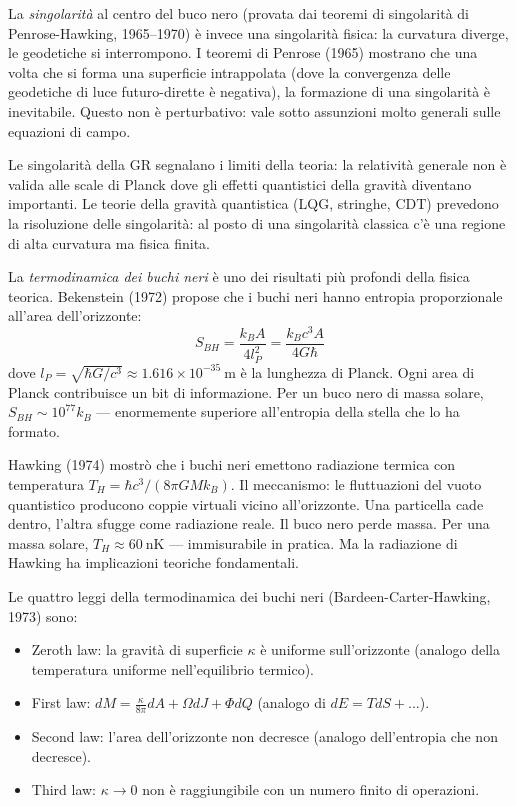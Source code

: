 \documentclass[11.5pt,a4paper,openany]{book}
\theoremstyle{remark}
\begin{document}
La \textit{singolarità} al centro del buco nero (provata dai teoremi di singolarità di Penrose-Hawking, 1965--1970) è invece una singolarità fisica: la curvatura diverge, le geodetiche si interrompono. I teoremi di Penrose (1965) mostrano che una volta che si forma una superficie intrappolata (dove la convergenza delle geodetiche di luce futuro-dirette è negativa), la formazione di una singolarità è inevitabile. Questo non è perturbativo: vale sotto assunzioni molto generali sulle equazioni di campo.

Le singolarità della GR segnalano i limiti della teoria: la relatività generale non è valida alle scale di Planck dove gli effetti quantistici della gravità diventano importanti. Le teorie della gravità quantistica (LQG, stringhe, CDT) prevedono la risoluzione delle singolarità: al posto di una singolarità classica c'è una regione di alta curvatura ma fisica finita.

La \textit{termodinamica dei buchi neri} è uno dei risultati più profondi della fisica teorica. Bekenstein (1972) propose che i buchi neri hanno entropia proporzionale all'area dell'orizzonte:
\[
S_{BH} = \frac{k_B A}{4 l_P^2} = \frac{k_B c^3 A}{4G\hbar}
\]
dove $l_P = \sqrt{\hbar G/c^3} \approx 1.616 \times 10^{-35}\ \text{m}$ è la lunghezza di Planck. Ogni area di Planck contribuisce un bit di informazione. Per un buco nero di massa solare, $S_{BH} \sim 10^{77} k_B$ --- enormemente superiore all'entropia della stella che lo ha formato.

Hawking (1974) mostrò che i buchi neri emettono radiazione termica con temperatura $T_H = \hbar c^3/(8\pi GM k_B)$. Il meccanismo: le fluttuazioni del vuoto quantistico producono coppie virtuali vicino all'orizzonte. Una particella cade dentro, l'altra sfugge come radiazione reale. Il buco nero perde massa. Per una massa solare, $T_H \approx 60\ \text{nK}$ --- immisurabile in pratica. Ma la radiazione di Hawking ha implicazioni teoriche fondamentali.

Le quattro leggi della termodinamica dei buchi neri (Bardeen-Carter-Hawking, 1973) sono:
\begin{itemize}
\item Zeroth law: la gravità di superficie $\kappa$ è uniforme sull'orizzonte (analogo della temperatura uniforme nell'equilibrio termico).
\item First law: $dM = \frac{\kappa}{8\pi}dA + \Omega dJ + \Phi dQ$ (analogo di $dE = TdS + ...$).
\item Second law: l'area dell'orizzonte non decresce (analogo dell'entropia che non decresce).
\item Third law: $\kappa \to 0$ non è raggiungibile con un numero finito di operazioni.
\end{itemize}
\end{document}
